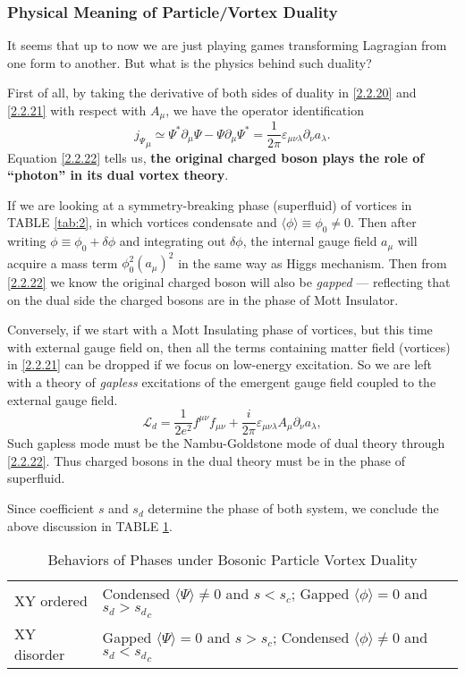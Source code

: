 \documentclass[10pt,nofootinbib]{revtex4}
\numberwithin{equation}{section}
\begin{document}
		\subsubsection{Physical Meaning of Particle/Vortex Duality}
		It seems that up to now we are just playing games transforming Lagragian from one form to another. But what is the physics behind such duality?\par
		First of all, by taking the derivative of both sides of duality in \eqref{2.2.20} and \eqref{2.2.21} with respect with $A_\mu$, we have the operator identification
		\begin{equation}\label{2.2.22}
			{j_\Psi}_\mu\simeq\Psi^*\partial_\mu\Psi-\Psi \partial_\mu\Psi^*=\dfrac{1}{2\pi}\varepsilon_{\mu\nu\lambda}\partial_\nu a_\lambda.
		\end{equation}
		Equation \eqref{2.2.22} tells us, \textbf{the original charged boson plays the role of ``photon'' in its dual vortex theory}.\par
		If we are looking at a symmetry-breaking phase (superfluid) of vortices in TABLE \ref{tab:2}, in which vortices condensate and $\langle \phi\rangle\equiv\phi_0\neq0$. Then after writing $\phi\equiv\phi_0+\delta\phi$ and integrating out $\delta\phi$, the internal gauge field $a_\mu$ will acquire a mass term $\phi_0^2(a_\mu)^2$ in the same way as Higgs mechanism. Then from \eqref{2.2.22} we know the original charged boson will also be \emph{gapped} --- reflecting that on the dual side the charged bosons are in the phase of Mott Insulator.\par
		Conversely, if we start with a Mott Insulating phase of vortices, but this time with external gauge field on, then all the terms containing matter field (vortices) in \eqref{2.2.21} can be dropped if we focus on low-energy excitation. So we are left with a theory of \emph{gapless} excitations of the emergent gauge field coupled to the external gauge field.
		\begin{equation*}
			\mathcal{L}_d=\dfrac{1}{2e^2}f^{\mu\nu}f_{\mu\nu}+\dfrac{i}{2\pi}\varepsilon_{\mu\nu\lambda}A_\mu \partial_\nu a_\lambda,
		\end{equation*}
		Such gapless mode must be the Nambu-Goldstone mode of dual theory through \eqref{2.2.22}. Thus charged bosons in the dual theory must be in the phase of superfluid.\par
		Since coefficient $s$ and $s_d$ determine the phase of both system, we conclude the above discussion in TABLE \ref{tab:3}.
 		\begin{table}[htp]
			\begin{tabular}{p{3cm}p{9cm}}
				XY ordered & Condensed $\langle \Psi\rangle\neq0$ and $s<s_c$; Gapped $\langle\phi\rangle=0$ and $s_d>{s_d}_c$ \\ 
				XY disorder & Gapped $\langle \Psi\rangle=0$ and $s>s_c$; Condensed $\langle\phi\rangle\neq0$ and $s_d<{s_d}_c$ \\ 
			\end{tabular}
			\caption{Behaviors of Phases under Bosonic Particle Vortex Duality}
			\label{tab:3}
		\end{table}


\end{document}
